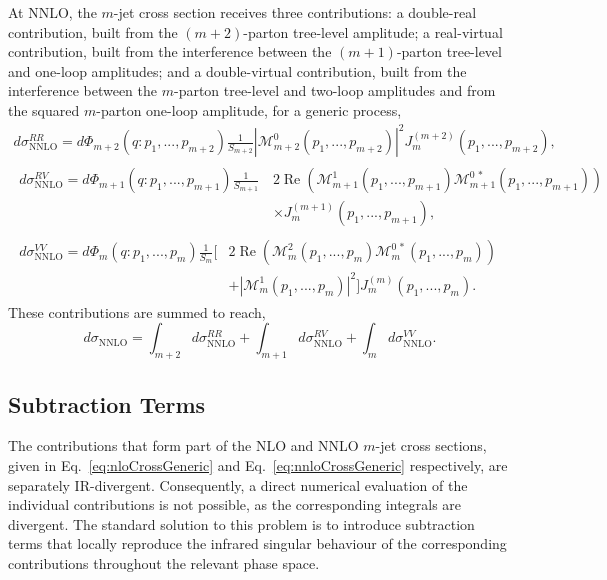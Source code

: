 At NNLO, the $m$-jet cross section receives three contributions: a double-real
contribution, built from the $(m+2)$-parton tree-level amplitude; a real-virtual
contribution, built from the interference between the $(m+1)$-parton tree-level
and one-loop amplitudes; and a double-virtual contribution, built from the
interference between the $m$-parton tree-level and two-loop amplitudes and from
the squared $m$-parton one-loop amplitude, for a generic process,
\begin{equation}
    \begin{gathered}
        d\sigma^{RR}_\text{NNLO} = d\Phi_{m+2}(q:p_1,...,p_{m+2})\frac1{S_{m+2}}|\mathcal M_{m+2}^0(p_1,...,p_{m+2})|^2J_m^{(m+2)}(p_1,...,p_{m+2}),\\
        \begin{aligned}
            d\sigma^{RV}_\text{NNLO} = d\Phi_{m+1}(q:p_1,...,p_{m+1})\frac1{S_{m+1}}\,&2\operatorname{Re}\!\left(\mathcal M_{m+1}^1(p_1,...,p_{m+1})\mathcal M_{m+1}^{0\,*}(p_1,...,p_{m+1})\right)\\
                                                                                  &\times J_m^{(m+1)}(p_1,...,p_{m+1}),
        \end{aligned}\\
        \begin{aligned}
            d\sigma^{VV}_\text{NNLO} = d\Phi_m(q:p_1,...,p_m)\frac1{S_m}\Big[&2\operatorname{Re}\!\left(\mathcal M_m^2(p_1,...,p_m)\mathcal M_m^{0\,*}(p_1,...,p_m)\right)\\
                                                                              &+|\mathcal M_m^1(p_1,...,p_m)|^2\Big]J_m^{(m)}(p_1,...,p_m).
        \end{aligned}
    \end{gathered}
\end{equation}
These contributions are summed to reach,
\begin{equation}\label{eq:nnloCrossGeneric}
    d\sigma_\text{NNLO}=\int_{m+2}d\sigma^{RR}_\text{NNLO}+\int_{m+1}d\sigma^{RV}_\text{NNLO}+\int_m d\sigma^{VV}_\text{NNLO}.
\end{equation}

\subsection{Subtraction Terms}\label{subsec:subTerms}

The contributions that form part of the NLO and NNLO $m$-jet cross sections, given
in Eq.~\eqref{eq:nloCrossGeneric} and Eq.~\eqref{eq:nnloCrossGeneric} respectively,
are separately IR-divergent. Consequently, a direct numerical evaluation of the
individual contributions is not possible, as the corresponding integrals are
divergent. The standard solution to this problem is to introduce subtraction terms that
locally reproduce the infrared singular behaviour of the corresponding
contributions throughout the relevant phase space.

